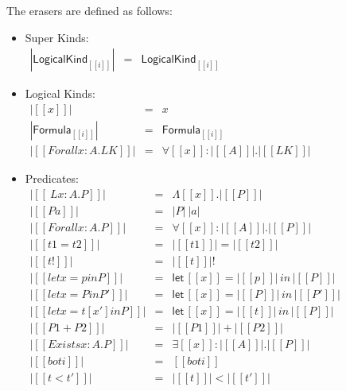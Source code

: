 \begin{definition}
  \label{def:eraser_function}
  The erasers are defined as follows:
  \begin{itemize}
  \item Super Kinds:\\
    \begin{math}
      \begin{array}{lll}
        |\mathsf{LogicalKind}_{[[i]]}| & = & \mathsf{LogicalKind}_{[[i]]}
      \end{array}
    \end{math}
  \item Logical Kinds:\\
    \begin{math}
      \begin{array}{lll}
        |[[x]]|                   & = & x\\
        |\mathsf{Formula}_{[[i]]}| & = & \mathsf{Formula}_{{[[i]]}}\\
        |[[Forall x : A . LK]]|   & = & \forall [[x]] : |[[A]]|.|[[LK]]|
      \end{array}
    \end{math}
    
  \item Predicates:\\
    \begin{math}
      \begin{array}{lll}
        |[[\ L x : A . P]]|       & = & \Lambda [[x]] . |[[P]]|\\
        |[[P a]]|                 & = & |P|\ |a|\\
        |[[Forall x : A . P]]|    & = & \forall [[x]]:|[[A]]|.|[[P]]|\\
        |[[t1 = t2]]|             & = & |[[t1]]| = |[[t2]]|\\
        |[[t !]]|                 & = & |[[t]]|!\\
        |[[let x = p in P]]|      & = & \mathsf{let}\,[[x]] = |[[p]]|\,in\,|[[P]]|\\
        |[[let x = P in P']]|     & = & \mathsf{let}\,[[x]] = |[[P]]|\,in\,|[[P']]|\\
        |[[let x = t [x'] in P]]| & = & \mathsf{let}\,[[x]] = |[[t]]|\,in\,|[[P]]|\\
        |[[P1 + P2]]|             & = & |[[P1]]| + |[[P2]]|\\
        |[[Exists x : A . P]]|    & = & \exists [[x]]:|[[A]]|.|[[P]]|\\
        |[[bot i]]|               & = & [[bot i]]\\
        |[[t < t']]|              & = & |[[t]]| < |[[t']]|
      \end{array}
    \end{math}
    

\end{itemize}
\end{definition}
